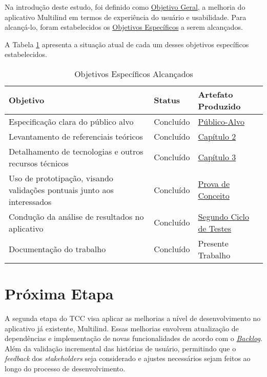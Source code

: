 Na introdução deste estudo, foi definido como \hyperref[sec:Objetivos]{Objetivo Geral}, a melhoria do aplicativo Multilind em termos de experiência do usuário e usabilidade. 
Para alcançá-lo, foram estabelecidos os \hyperref[sec:Objetivos]{Objetivos Específicos} a serem alcançados.

A Tabela \ref{tab09} apresenta a situação atual de cada um desses objetivos específicos estabelecidos.

\begin{table}[h!]
	\centering
	\caption{Objetivos Específicos Alcançados}
	\label{tab09}
	\begin{tabularx}{\textwidth}{p{8cm}|p{2cm}|p{4cm}}
	\hline
    Objetivo                                                        & Status       & Artefato Produzido             \\ \hline
    Especificação clara do público alvo                                                     & Concluído    & \hyperref[Publico-Alvo]{Público-Alvo}              \\
    Levantamento de referenciais teóricos                                          & Concluído    & \hyperref[chap:Referencial]{Capítulo 2}                   \\
    Detalhamento de tecnologias e outros recursos técnicos                                       & Concluído    & \hyperref[chap:ReferencialTech]{Capítulo 3}                    \\
    Uso de prototipação, visando validações pontuais junto aos interessados                                      & Concluído    & \hyperref[sec:Prova de Conceito]{Prova de Conceito}                   \\
    Condução da análise de resultados no aplicativo                                          & Concluído    & \hyperref[sec:Segundo Ciclo]{Segundo Ciclo de Testes}                    \\
    Documentação do trabalho                       & Concluído    & Presente Trabalho         \\ \hline
	\end{tabularx}
\end{table}

\section{Próxima Etapa}
\label{sec:Proxima Etapa}
A segunda etapa do TCC visa aplicar as melhorias a nível de desenvolvimento no aplicativo já existente, Multilind. Essas melhorias envolvem atualização de dependências e implementação 
de novas funcionalidades de acordo com o \hyperref[sec:Backlog de Melhorias]{\textit{Backlog}}. Além da validação incremental das histórias de usuário, permitindo que o \textit{feedback} 
dos \textit{stakeholders} seja considerado e ajustes necessários sejam feitos ao longo do processo de desenvolvimento.